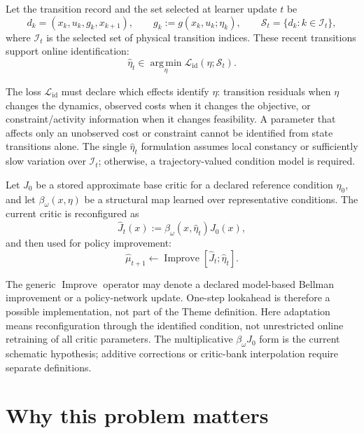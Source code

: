 \documentclass[a4paper]{article}
\begin{document}
Let the transition record and the set selected at learner update $t$ be
\begin{equation}
  d_k=(x_k,u_k,g_k,x_{k+1}),
  \qquad
  g_k:=g(x_k,u_k;\eta_k),
  \qquad
  \mathcal S_t=\{d_k:k\in\mathcal I_t\},
\end{equation}
where $\mathcal I_t$ is the selected set of physical transition indices.
These recent transitions support online identification:
\begin{equation}
  \widehat\eta_t
  \in
  \operatorname*{arg\,min}_{\eta}
  \mathcal L_{\mathrm{id}}(\eta;\mathcal S_t).
\end{equation}

The loss $\mathcal L_{\mathrm{id}}$ must declare which effects identify
$\eta$: transition residuals when $\eta$ changes the dynamics, observed costs
when it changes the objective, or constraint/activity information when it
changes feasibility. A parameter that affects only an unobserved cost or
constraint cannot be identified from state transitions alone. The single
$\widehat\eta_t$ formulation assumes local constancy or sufficiently slow
variation over $\mathcal I_t$; otherwise, a trajectory-valued condition model
is required.

Let $J_0$ be a stored approximate base critic for a declared reference
condition $\eta_0$, and let $\beta_\omega(x,\eta)$ be a structural map learned
over representative conditions. The current critic is reconfigured as
\begin{equation}
  \widehat J_t(x):=\beta_\omega(x,\widehat\eta_t)J_0(x),
\end{equation}
and then used for policy improvement:
\begin{equation}
  \widehat\mu_{t+1}
  \leftarrow
  \operatorname{Improve}
  \!\left[\widehat J_t;\widehat\eta_t\right].
\end{equation}

The generic $\operatorname{Improve}$ operator may denote a declared
model-based Bellman improvement or a policy-network update. One-step lookahead
is therefore a possible implementation, not part of the Theme definition.
Here adaptation means reconfiguration through the identified condition, not
unrestricted online retraining of all critic parameters. The multiplicative
$\beta_\omega J_0$ form is the current schematic hypothesis; additive
corrections or critic-bank interpolation require separate definitions.

\section{Why this problem matters}
\end{document}
